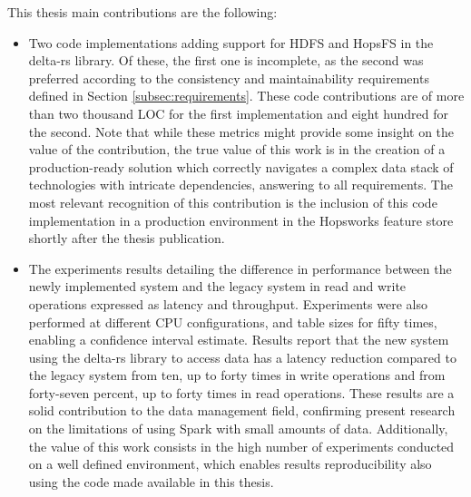 This thesis main contributions are the following:
\begin{itemize}
    \item Two code implementations adding support for \gls{HDFS} and \gls{HopsFS} in the delta-rs library. Of these, the first one is incomplete, as the second was preferred according to the consistency and maintainability requirements defined in Section \ref{subsec:requirements}. These code contributions are of more than two thousand \gls{LOC} for the first implementation and eight hundred for the second. Note that while these metrics might provide some insight on the value of the contribution, the true value of this work is in the creation of a production-ready solution which correctly navigates a complex data stack of technologies with intricate dependencies, answering to all requirements. The most relevant recognition of this contribution is the inclusion of this code implementation in a production environment in the Hopsworks feature store shortly after the thesis publication.
    \item The experiments results detailing the difference in performance between the newly implemented system and the legacy system in read and write operations expressed as latency and throughput. Experiments were also performed at different \gls{CPU} configurations, and table sizes for fifty times, enabling a confidence interval estimate. Results report that the new system using the delta-rs library to access data has a latency reduction compared to the legacy system from ten, up to forty times in write operations and from forty-seven percent, up to forty times in read operations. These results are a solid contribution to the data management field, confirming present research on the limitations of using Spark with small amounts of data. Additionally, the value of this work consists in the high number of experiments conducted on a well defined environment, which enables results reproducibility also using the code made available in this thesis.
\end{itemize}